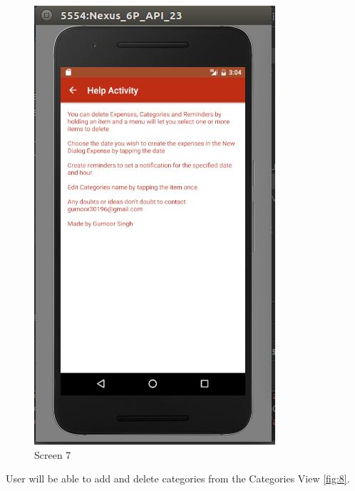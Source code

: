 \begin{figure}[ht]
\centering
\includegraphics[scale=0.38]{images/s7.png}
\caption{Screen 7}
\label{fig:7}
\end{figure}
\noindent User will be able to add and delete categories from the Categories View \ref{fig:8}. 

